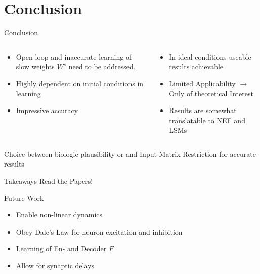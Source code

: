 \documentclass[17pt, t, lualatex]{beamer}
\begin{document}
\section{Conclusion}\insertsectionpage
\begin{frame}{Conclusion}
	\vspace{-1cm}
	\begin{columns}
		\begin{column}{0.45\textwidth}
			\begin{itemize}
				\setlength\itemsep{0.7em}
				\item Open loop and inaccurate learning of slow weights $W^s$ need to be addressed.
				\item Highly dependent on initial conditions in learning
				\item Impressive accuracy
			\end{itemize}
		\end{column}
		\vrule
		\begin{column}{0.45\textwidth}
			\begin{itemize}
				\setlength\itemsep{0.7em}
				\item In ideal conditions useable results achievable
				\item Limited Applicability $\rightarrow$ Only of theoretical Interest
				\item Results are somewhat translatable to NEF and LSMs
			\end{itemize}
		\end{column}
	\end{columns}
	\vspace{0.5cm}
	Choice between biologic plausibility or and Input Matrix Restriction for accurate results
\end{frame}


\begin{frame}{Takeaways}
	Read the Papers!
\end{frame}




\begin{frame}{Future Work}
	\begin{itemize}
		\setlength\itemsep{1.5em}
		\item Enable non-linear dynamics
		\item Obey Dale's Law for neuron excitation and inhibition
		\item Learning of En- and Decoder $F$
		\item Allow for synaptic delays
	\end{itemize}
\end{frame}
\end{document}
